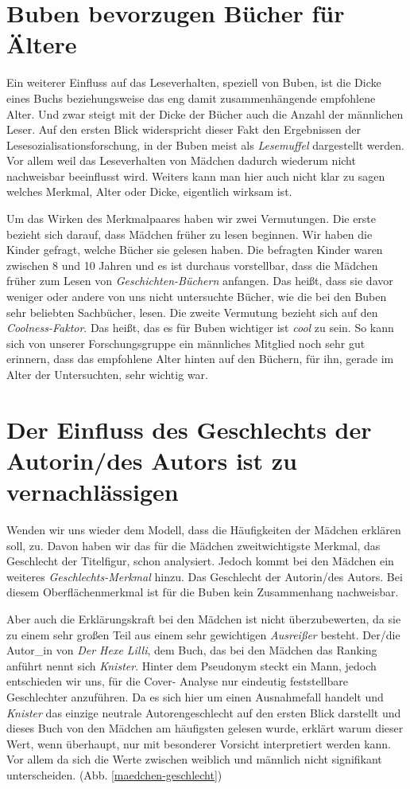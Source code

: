 \section{Buben bevorzugen Bücher für Ältere}

Ein weiterer Einfluss auf das Leseverhalten, speziell von Buben, ist die
Dicke eines Buchs beziehungsweise das eng damit zusammenhängende
empfohlene Alter. Und zwar steigt mit der Dicke der Bücher auch die
Anzahl der männlichen Leser. Auf den ersten Blick widerspricht dieser
Fakt den Ergebnissen der Lesesozialisationsforschung, in der Buben meist
als \emph{Lesemuffel} dargestellt werden. Vor allem weil das
Leseverhalten von Mädchen dadurch wiederum nicht nachweisbar beeinflusst
wird. Weiters kann man hier auch nicht klar zu sagen welches Merkmal,
Alter oder Dicke, eigentlich wirksam ist.

Um das Wirken des Merkmalpaares haben wir zwei Vermutungen. Die erste
bezieht sich darauf, dass Mädchen früher zu lesen beginnen. Wir haben
die Kinder gefragt, welche Bücher sie gelesen haben. Die befragten
Kinder waren zwischen 8 und 10 Jahren und es ist durchaus vorstellbar,
dass die Mädchen früher zum Lesen von \emph{Geschichten-Büchern}
anfangen. Das heißt, dass sie davor weniger oder andere von uns nicht
untersuchte Bücher, wie die bei den Buben sehr beliebten Sachbücher,
lesen. Die zweite Vermutung bezieht sich auf den \emph{Coolness-Faktor}.
Das heißt, das es für Buben wichtiger ist \emph{cool} zu sein. So kann
sich von unserer Forschungsgruppe ein männliches Mitglied noch sehr gut
erinnern, dass das empfohlene Alter hinten auf den Büchern, für ihn,
gerade im Alter der Untersuchten, sehr wichtig war.

\section{Der Einfluss des Geschlechts der Autorin/des Autors ist zu
vernachlässigen}

Wenden wir uns wieder dem Modell, dass die Häufigkeiten der Mädchen
erklären soll, zu. Davon haben wir das für die Mädchen zweitwichtigste
Merkmal, das Geschlecht der Titelfigur, schon analysiert. Jedoch kommt
bei den Mädchen ein weiteres \emph{Geschlechts-Merkmal} hinzu. Das
Geschlecht der Autorin/des Autors. Bei diesem Oberflächenmerkmal ist für
die Buben kein Zusammenhang nachweisbar.

Aber auch die Erklärungskraft bei den Mädchen ist nicht überzubewerten,
da sie zu einem sehr großen Teil aus einem sehr gewichtigen
\emph{Ausreißer} besteht. Der/die Autor\_in von \emph{Der Hexe Lilli},
dem Buch, das bei den Mädchen das Ranking anführt nennt sich
\emph{Knister}. Hinter dem Pseudonym steckt ein Mann, jedoch entschieden
wir uns, für die Cover- Analyse nur eindeutig feststellbare Geschlechter
anzuführen. Da es sich hier um einen Ausnahmefall handelt und
\emph{Knister} das einzige neutrale Autorengeschlecht auf den ersten
Blick darstellt und dieses Buch von den Mädchen am häufigsten gelesen
wurde, erklärt warum dieser Wert, wenn überhaupt, nur mit besonderer
Vorsicht interpretiert werden kann. Vor allem da sich die Werte zwischen
weiblich und männlich nicht signifikant unterscheiden. (Abb.
\ref{maedchen-geschlecht})

